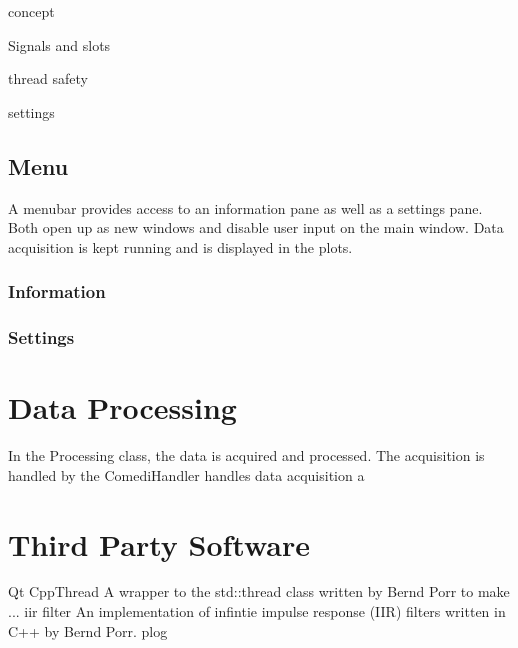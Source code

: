 concept

Signals and slots

thread safety

settings

\subsection{Menu}
A menubar provides access to an information pane as well as a settings pane. Both open up as new windows and disable user input on the main window. Data acquisition is kept running and is displayed in the plots. 

\subsubsection{Information}

\subsubsection{Settings}



\section{Data Processing}
In the Processing class, the data is acquired and processed. The acquisition is handled by the ComediHandler handles data acquisition a	

\section{Third Party Software}
Qt
CppThread A wrapper to the std::thread class written by Bernd Porr to make ...
iir filter An implementation of infintie impulse response (IIR) filters written in C++ by Bernd Porr.
plog 